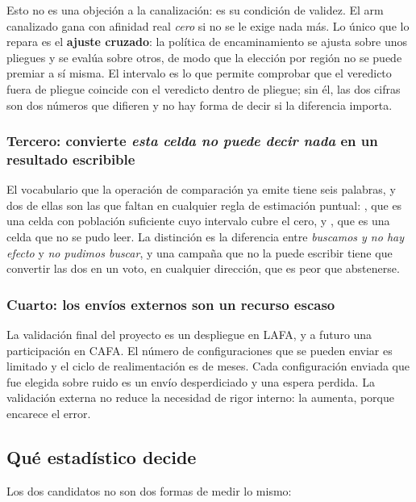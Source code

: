 Esto no es una objeción a la canalización: es su condición de validez. El arm
canalizado gana con afinidad real \emph{cero} si no se le exige nada más. Lo único
que lo repara es el \textbf{ajuste cruzado}: la política de encaminamiento se ajusta
sobre unos pliegues y se evalúa sobre otros, de modo que la elección por región no
se puede premiar a sí misma. El intervalo es lo que permite comprobar que el
veredicto fuera de pliegue coincide con el veredicto dentro de pliegue; sin él, las
dos cifras son dos números que difieren y no hay forma de decir si la diferencia
importa.

\subsubsection*{Tercero: convierte \emph{esta celda no puede decir nada} en un
resultado escribible}

El vocabulario que la operación de comparación ya emite tiene seis palabras, y dos
de ellas son las que faltan en cualquier regla de estimación puntual:
, que es una celda con población suficiente cuyo intervalo
cubre el cero, y , que es una celda que no se pudo leer. La
distinción es la diferencia entre \emph{buscamos y no hay efecto} y \emph{no
pudimos buscar}, y una campaña que no la puede escribir tiene que convertir las dos
en un voto, en cualquier dirección, que es peor que abstenerse.

\subsubsection*{Cuarto: los envíos externos son un recurso escaso}

La validación final del proyecto es un despliegue en LAFA, y a futuro una
participación en CAFA. El número de configuraciones que se pueden enviar es
limitado y el ciclo de realimentación es de meses. Cada configuración enviada que
fue elegida sobre ruido es un envío desperdiciado y una espera perdida. La
validación externa no reduce la necesidad de rigor interno: la aumenta, porque
encarece el error.

\subsection{Qué estadístico decide}

Los dos candidatos no son dos formas de medir lo mismo:

